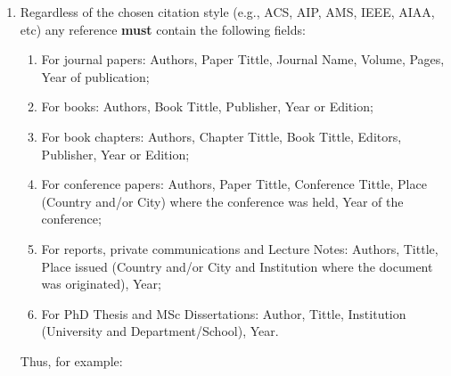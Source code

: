 \documentclass[14pt,twoside]{report}
\begin{document}
\begin{enumerate}
\begin{enumerate}
\item Regardless of the chosen citation style (e.g., ACS, AIP, AMS, IEEE, AIAA, etc) any reference {\bf must} contain the following fields: 
\begin{enumerate}
\item For journal papers: Authors, Paper Tittle, Journal Name, Volume, Pages, Year of publication;
\item For books: Authors, Book Tittle, Publisher, Year or Edition;
\item For book chapters: Authors, Chapter Tittle, Book Tittle, Editors, Publisher, Year or Edition;
\item For conference papers: Authors, Paper Tittle, Conference Tittle, Place (Country and/or City) where the conference was held, Year of the conference;
\item For reports,  private communications and Lecture Notes: Authors, Tittle, Place issued (Country and/or City and Institution where the document was originated), Year;
\item For PhD Thesis and MSc Dissertations: Author, Tittle, Institution (University and Department/School), Year.
\end{enumerate}  
Thus, for example:
%
\end{enumerate}


\end{enumerate}
\end{document}
